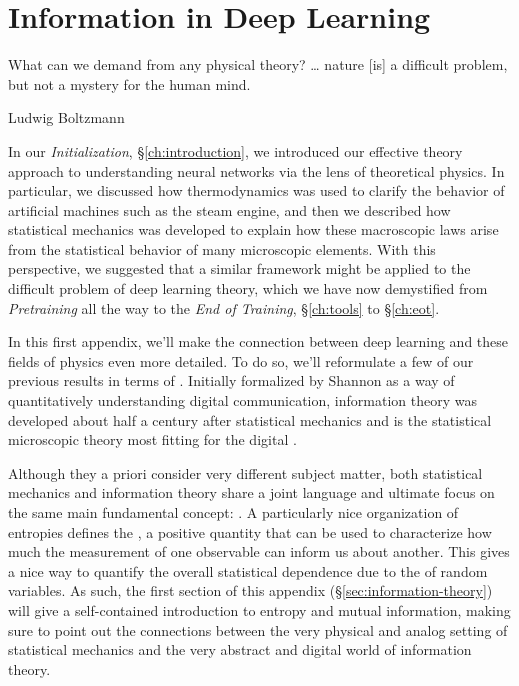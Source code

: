 

\chapter{Information in Deep Learning}\label{app:mi-stuff}
\epigraph{What can we demand from any physical theory? \dots
nature
[is]
a difficult problem, but not a mystery for the human
mind. 
}{Ludwig Boltzmann 
\cite{boltzman-quote}
}


\noindent{}In our \emph{Initialization}, \S\ref{ch:introduction}, we introduced our effective theory approach to understanding neural networks via the lens of theoretical physics. In particular, we discussed how thermodynamics was used to clarify the behavior of artificial machines such as the steam engine, and then we described how statistical mechanics was developed to explain how these macroscopic laws  arise from the statistical behavior of many microscopic elements. With this perspective,
we suggested that a similar framework might be applied to the difficult problem of deep learning theory, which we have now  demystified  from \emph{Pretraining} all the way to the \emph{End of Training}, \S\ref{ch:tools} to \S\ref{ch:eot}.



In this first appendix, we'll make the connection between deep learning and these fields of physics even more detailed. To do so, we'll reformulate a few of our previous results in 
terms of 
. Initially formalized by Shannon as a way of quantitatively understanding digital communication, information theory  was developed about half a century after statistical mechanics 
and is the statistical microscopic theory 
most fitting for the digital . 





Although they a priori consider very different subject matter, both statistical mechanics and information theory share a joint language and ultimate focus on 
the same main fundamental concept: .
A particularly nice organization of entropies defines the , a positive quantity that can be used to characterize how much the measurement of one observable can inform us about another.
This gives a nice way to quantify the overall statistical dependence due to the  of random variables. As such, the first section of this appendix (\S\ref{sec:information-theory}) will give a self-contained introduction to entropy and mutual information, 
making sure to point out
the connections between the very physical and analog setting of statistical mechanics and the very abstract and 
digital world of information theory.

